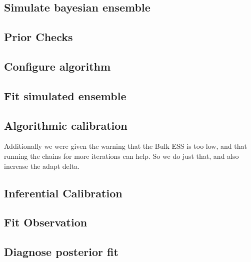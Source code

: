 \documentclass[11pt, oneside, openany]{scrbook}
\begin{document}
\hypertarget{simulate-bayesian-ensemble}{%
\subsection{Simulate bayesian ensemble}\label{simulate-bayesian-ensemble}}

\hypertarget{prior-checks}{%
\subsection{Prior Checks}\label{prior-checks}}

\hypertarget{configure-algorithm}{%
\subsection{Configure algorithm}\label{configure-algorithm}}

\hypertarget{fit-simulated-ensemble}{%
\subsection{Fit simulated ensemble}\label{fit-simulated-ensemble}}

\hypertarget{algorithmic-calibration}{%
\subsection{Algorithmic calibration}\label{algorithmic-calibration}}

Additionally we were given the warning that the Bulk ESS is too low, and that running the chains for more iterations can help. So we do just that, and also increase the adapt delta.

\hypertarget{inferential-calibration}{%
\subsection{Inferential Calibration}\label{inferential-calibration}}

\hypertarget{fit-observation}{%
\subsection{Fit Observation}\label{fit-observation}}

\hypertarget{diagnose-posterior-fit}{%
\subsection{Diagnose posterior fit}\label{diagnose-posterior-fit}}
\end{document}

